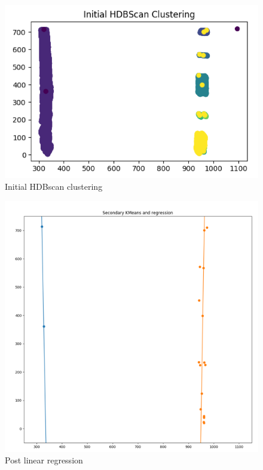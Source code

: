 \documentclass[twoside,twocolumn]{article}
\begin{document}
\begin{figure}
  \includegraphics[width=\linewidth]{daniel3.png}
  \caption{Initial HDBscan clustering}
  \label{fig:d3}
\end{figure}

\begin{figure}
  \includegraphics[width=\linewidth]{daniel4.png}
  \caption{Post linear regression}
  \label{fig:d4}
\end{figure}
\end{document}
